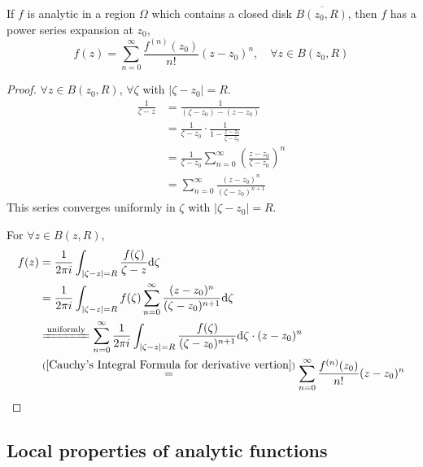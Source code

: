 \begin{theorem}
    If  $ f $ is analytic in a region  $ \Omega $ which contains a closed disk  $ \overline{B(z_0,R)} $, then  $ f $ has a power series expansion at  $ z_0 $,
    \begin{equation}
        f(z)=\sum_{n=0}^\infty \frac{f^{(n)}(z_0)}{n!}(z-z_0)^n,\quad \forall z\in B(z_0,R)
    \end{equation}  
    \begin{proof}
         $ \forall z\in B(z_0,R)$, $ \forall \zeta $ with  $ |\zeta-z_0|=R $.
         \begin{equation}
            \begin{aligned}
                \frac{1}{\zeta-z}&=\frac{1}{(\zeta-z_0)-(z-z_0)}\\
                &=\frac{1}{\zeta-z_0}\cdot\frac{1}{1-\frac{z-z_0}{\zeta-z_0}}\\
                &=\frac{1}{\zeta-z_0}\sum_{n=0}^\infty\left(\frac{z-z_0}{\zeta-z_0}\right)^n\\
                &=\sum_{n=0}^\infty\frac{(z-z_0)^n}{(\zeta-z_0)^{n+1}}
            \end{aligned}
         \end{equation}   
         This series converges uniformly in  $ \zeta $ with  $ |\zeta-z_0|=R $.
         
         For  $ \forall z\in B(z,R) $,
         \begin{equation}
            \begin{aligned}
                f(z)&=\frac{1}{2\pi i}\int_{|\zeta-z|=R}\frac{f(\zeta)}{\zeta-z}\mathrm{d}\zeta\\
                &=\frac{1}{2\pi i}\int_{|\zeta-z|=R}f(\zeta)\sum_{n=0}^\infty\frac{(z-z_0)^n}{(\zeta-z_0)^{n+1}}\mathrm{d}\zeta\\
                &\xlongequal{\text{uniformly}}\sum_{n=0}^\infty \frac{1}{2\pi i}\int_{|\zeta-z|=R}\frac{f(\zeta)}{(\zeta-z_0)^{n+1}}\mathrm{d}\zeta\cdot(z-z_0)^n\\
                &\overset{(\ref{Cauchy's Integral Formula for derivative vertion})}{=}\sum_{n=0}^\infty \frac{f^{(n)}(z_0)}{n!}(z-z_0)^n
            \end{aligned}
         \end{equation}
    \end{proof}   
\end{theorem}
\subsection{Local properties of analytic functions}
